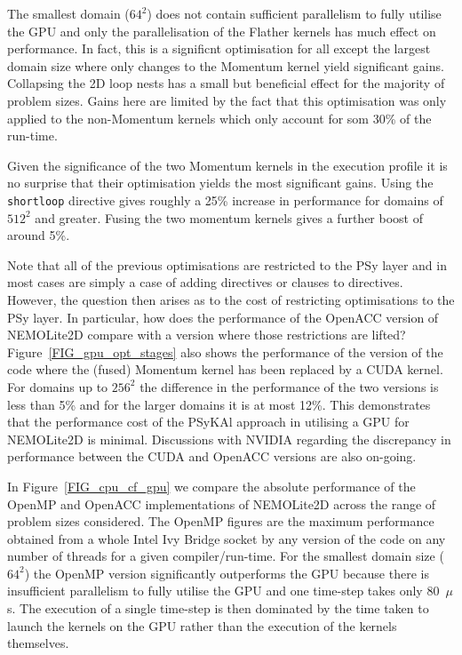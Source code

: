 \documentclass[gmd, manuscript]{copernicus}
\begin{document}
The smallest domain ($64^2$) does not contain sufficient parallelism
to fully utilise the GPU and only the parallelisation of the Flather
kernels has much effect on performance. In fact, this is a significnt
optimisation for all except the largest domain size where only changes
to the Momentum kernel yield significant gains. Collapsing the 2D loop
nests has a small but beneficial effect for the majority of problem
sizes. Gains here are limited by the fact that this optimisation was
only applied to the non-Momentum kernels which only account for som
30\% of the run-time.

Given the significance of the two Momentum kernels in the execution
profile it is no surprise that their optimisation yields the most
significant gains. Using the \texttt{shortloop} directive gives
roughly a 25\% increase in performance for domains of $512^2$ and
greater. Fusing the two momentum kernels gives a further boost of
around 5\%. 

Note that all of the previous optimisations are restricted to the PSy
layer and in most cases are simply a case of adding directives or
clauses to directives. However, the question then arises as to the
cost of restricting optimisations to the PSy layer. In particular, how
does the performance of the OpenACC version of NEMOLite2D compare with
a version where those restrictions are lifted?
Figure~\ref{FIG_gpu_opt_stages} also shows the performance of the
version of the code where the (fused) Momentum kernel has been
replaced by a CUDA kernel. For domains up to $256^2$ the difference in
the performance of the two versions is less than 5\% and for the
larger domains it is at most 12\%. This demonstrates that the
performance cost of the {PS}y{KA}l approach in utilising a GPU for
NEMOLite2D is minimal. Discussions with NVIDIA regarding the
discrepancy in performance between the CUDA and OpenACC versions are
also on-going.

In Figure~\ref{FIG_cpu_cf_gpu} we compare the absolute performance of
the OpenMP and OpenACC implementations of NEMOLite2D across the range
of problem sizes considered. The OpenMP figures are the maximum
performance obtained from a whole Intel Ivy Bridge socket by any
version of the code on any number of threads for a given
compiler/run-time. For the smallest domain size ($64^2$) the OpenMP
version significantly outperforms the GPU because there is
insufficient parallelism to fully utilise the GPU and one time-step
takes only 80~$\mu$s. The execution of a single time-step is then
dominated by the time taken to launch the kernels on the GPU rather than
the execution of the kernels themselves.
\end{document}
